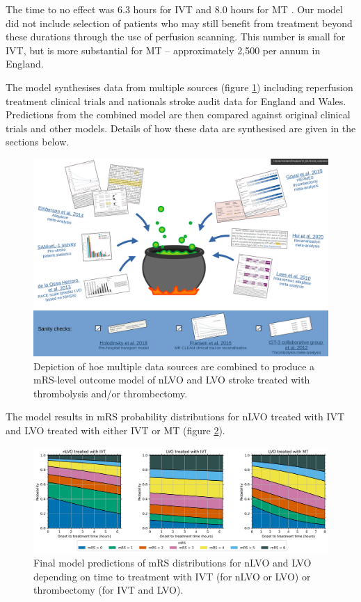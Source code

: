 The time to no effect was 6.3 hours for IVT \cite{emberson_effect_2014} and 8.0 hours for MT \cite{ fransen_time_2016}. Our model did not include selection of patients who may still benefit from treatment beyond these durations through the use of perfusion scanning. This number is small for IVT, but is more substantial for MT – approximately 2,500 per annum in England. 

The model synthesises data from multiple sources (figure \ref{fig:data_cauldron}) including reperfusion treatment clinical trials and nationals stroke audit data for England and Wales. Predictions from the combined model are then compared against original clinical trials and other models. Details of how these data are synthesised are given in the sections below.

\begin{figure}[h!]
    \centering
    \includegraphics[width=1.0\linewidth]{images_modelling/data_cauldron.png}
    \caption{Depiction of hoe multiple data sources are combined to produce a mRS-level outcome model of nLVO and LVO stroke treated with thrombolysis and/or thrombectomy.}
    \label{fig:data_cauldron}
\end{figure}

The model results in mRS probability distributions for nLVO treated with IVT and LVO treated with either IVT or MT (figure \ref{fig:probs_with_time}).

\begin{figure}[h!]
    \centering
    \includegraphics[width=1.0\linewidth]{images_modelling/probs_with_time.jpg}
    \caption{Final model predictions of mRS distributions for nLVO and LVO depending on time to treatment with IVT (for nLVO or LVO) or thrombectomy (for IVT and LVO).}
    \label{fig:probs_with_time}
\end{figure}

